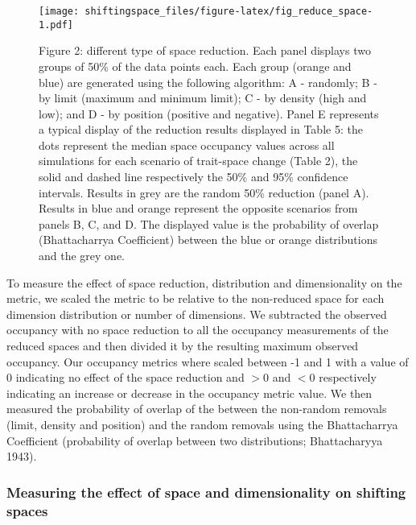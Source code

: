 \documentclass[]{article}
\begin{document}
\begin{figure}
\centering
\texttt{[image: shiftingspace\_files/figure-latex/fig\_reduce\_space-1.pdf]}
\caption{Figure 2: different type of space reduction. Each panel
displays two groups of 50\% of the data points each. Each group (orange
and blue) are generated using the following algorithm: A - randomly; B -
by limit (maximum and minimum limit); C - by density (high and low); and
D - by position (positive and negative). Panel E represents a typical
display of the reduction results displayed in Table 5: the dots
represent the median space occupancy values across all simulations for
each scenario of trait-space change (Table 2), the solid and dashed line
respectively the 50\% and 95\% confidence intervals. Results in grey are
the random 50\% reduction (panel A). Results in blue and orange
represent the opposite scenarios from panels B, C, and D. The displayed
value is the probability of overlap (Bhattacharrya Coefficient) between
the blue or orange distributions and the grey one.}
\end{figure}

To measure the effect of space reduction, distribution and
dimensionality on the metric, we scaled the metric to be relative to the
non-reduced space for each dimension distribution or number of
dimensions. We subtracted the observed occupancy with no space reduction
to all the occupancy measurements of the reduced spaces and then divided
it by the resulting maximum observed occupancy. Our occupancy metrics
where scaled between -1 and 1 with a value of 0 indicating no effect of
the space reduction and \(>0\) and \(<0\) respectively indicating an
increase or decrease in the occupancy metric value. We then measured the
probability of overlap of the between the non-random removals (limit,
density and position) and the random removals using the Bhattacharrya
Coefficient (probability of overlap between two distributions;
Bhattacharyya 1943).

\subsubsection{Measuring the effect of space and dimensionality on
shifting
spaces}\label{measuring-the-effect-of-space-and-dimensionality-on-shifting-spaces}
\end{document}
